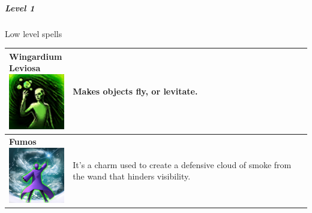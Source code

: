 \subparagraph{Level 1} 
Low level spells \\
\begin{tabular}{ p{3cm}p{14cm} } \hline
	\specialcell[p]{\textbf{Wingardium} \\ \textbf{Leviosa}         \\ \includegraphics[width=2.5cm]{../Pictures/Gameplay/Spells/Icon/Wingardium_spell_icon.png}}         & Makes objects fly, or levitate. \\ \hline
	\specialcell[p]{\textbf{Fumos}         \\ \includegraphics[width=2.5cm]{../Pictures/Gameplay/Spells/Icon/Fumos_spell_icon.png}}         & It's a charm used to create a defensive cloud of smoke from the wand that hinders visibility. \\ \hline
\end{tabular}                                                                                                                                 


